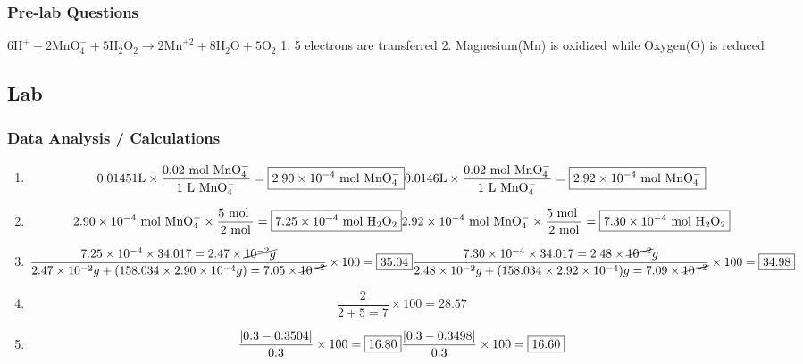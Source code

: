 \documentclass[
]{article}
\begin{document}
\hypertarget{pre-lab-questions}{%
\subsubsection{Pre-lab Questions}\label{pre-lab-questions}}

\(6\text{H}^{+} + 2\text{MnO}_4^{-} + 5\text{H}_2\text{O}_2 \rightarrow 2\text{Mn}^{+2} + 8\text{H}_2\text{O} + 5\text{O}_2\)
1. 5 electrons are transferred 2. Magnesium(\(\text{Mn}\)) is oxidized
while Oxygen(\(\text{O}\)) is reduced

\hypertarget{lab}{%
\subsection{Lab}\label{lab}}

\hypertarget{data-analysis-calculations}{%
\subsubsection{Data Analysis /
Calculations}\label{data-analysis-calculations}}

\begin{enumerate}
\def\labelenumi{\arabic{enumi}.}
\item
  \[0.01451\text{L} \times \frac{0.02\text{ mol MnO}_4^{-}}{1 \text{ L MnO}_4^{-}} = \boxed{2.90\times10^{-4}\text{ mol MnO}_4^{-}} \\ 0.0146\text{L} \times \frac{0.02\text{ mol MnO}_4^{-}}{1 \text{ L MnO}_4^{-}} = \boxed{2.92\times10^{-4}\text{ mol MnO}_4^{-}}\]
\item
  \[2.90\times10^{-4}\text{ mol MnO}_4^{-} \times \frac{5\text{ mol }}{2 \text{ mol}}=\boxed{7.25\times 10^{-4}\text{ mol H}_2\text{O}_2} \newline 2.92\times10^{-4}\text{ mol MnO}_4^{-} \times \frac{5\text{ mol }}{2 \text{ mol}}=\boxed{7.30\times 10^{-4}\text{ mol H}_2\text{O}_2}\]
\item
  \[\frac{7.25\times 10^{-4} \times 34.017 = 2.47 \times \cancel{10^{-2}g}}{2.47\times 10^{-2}g + (158.034 \times 2.90 \times{10^{-4}}g)= 7.05 \times \cancel{10^{-2}}}\times 100 = \boxed{35.04} \newline \frac{7.30\times 10^{-4} \times 34.017 = 2.48 \times \cancel{10^{-2}}g}{2.48 \times 10^{-2}g + (158.034 \times 2.92 \times{10^{-4}})g = 7.09 \times \cancel{10^{-2}}}\times100 = \boxed{34.98}\]
\item
  \[\frac{2}{2+5 = 7}\times 100 = \boxed{28.57}\]
\item
  \[ \frac{|0.3-0.3504|}{0.3} \times 100 = \boxed{16.80} \newline \frac{|0.3-0.3498|}{0.3} \times 100 = \boxed{16.60}\]
\end{enumerate}
\end{document}
